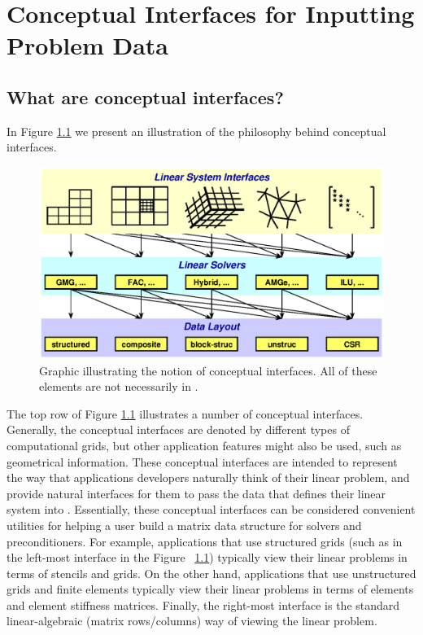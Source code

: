 \chapter{Conceptual Interfaces for Inputting Problem Data}
\label{Conceptual Interfaces}

\section{What are conceptual interfaces?}

In Figure \ref{fig-conceptual-interface} we present an illustration
of the philosophy behind conceptual interfaces.


\begin{figure}
\centering
\includegraphics[width=5in]{concep_iface.eps}
\caption{%
Graphic illustrating the notion of conceptual interfaces.
All of these elements are not necessarily in \hypre{}.}
\label{fig-conceptual-interface}
\end{figure}

The top row of Figure \ref{fig-conceptual-interface} 
illustrates a number of conceptual interfaces.  Generally,
the conceptual interfaces are denoted by different types of computational
grids,  but other application features might also be used, such as
geometrical information.  
These conceptual interfaces are intended to represent the
way that applications developers naturally think of their linear problem, and
provide natural interfaces for them to pass the data that defines
their linear system into \hypre{}. 
Essentially, these conceptual interfaces can be considered  
convenient utilities for helping a user build a matrix data structure
for \hypre{} solvers and preconditioners.
For
example, applications that use structured grids (such as in the left-most
interface in the Figure ~\ref{fig-conceptual-interface})
typically view their linear problems in terms of
stencils and grids.  On the other hand, applications that use unstructured
grids and finite elements typically view their linear problems in terms of
elements and element stiffness matrices.  Finally, the right-most interface is
the standard linear-algebraic (matrix rows/columns) way of viewing the
linear problem.

